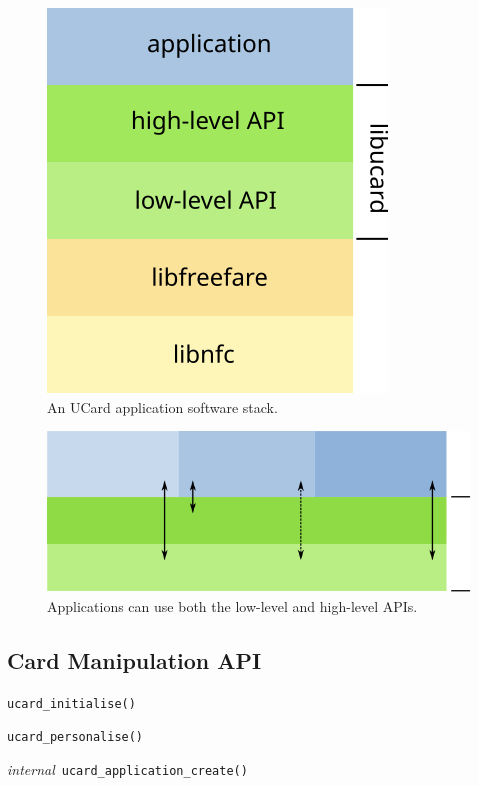 \documentclass{article}
\newcommand{\internal}{\textsl{internal}~}
\begin{document}
\begin{figure}[htp]
  \centering
  \includegraphics[scale=1]{layers}
	\caption{An UCard application software stack.}
\end{figure}

\begin{figure}[htp]
  \centering
  \includegraphics[scale=1]{applications}
	\caption{Applications can use both the low-level and high-level APIs.}
\end{figure}



\subsection{Card Manipulation API}


\texttt{ucard\_initialise()}

\texttt{ucard\_personalise()}


\internal \texttt{ucard\_application\_create()}
\end{document}

